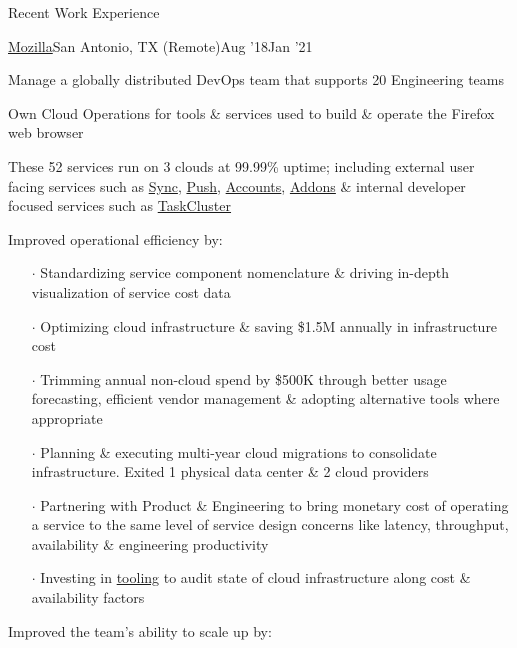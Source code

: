 \documentclass{resume} %
\begin{document}
\begin{rSection}{Recent Work Experience}
\begin{rSubsection}{\href{https://www.mozilla.org/}{Mozilla}}{San Antonio, TX (Remote)}{Aug '18}{Jan '21}
\item Manage a globally distributed DevOps team that supports 20 Engineering teams
\item Own Cloud Operations for tools \& services used to build \& operate the Firefox web browser
\item These 52 services run on 3 clouds at 99.99\% uptime; including external user facing services such as \href{https://github.com/mozilla-services/syncstorage-rs}{Sync}, \href{https://github.com/mozilla-services/autopush-rs}{Push}, \href{https://github.com/mozilla/fxa}{Accounts}, \href{https://github.com/mozilla/addons}{Addons} \& internal developer focused services such as \href{https://github.com/taskcluster}{TaskCluster}
  \item Improved operational efficiency by:
  \vspace{-0.5em}
    \begin{itemize} \itemsep0.5pt \parskip0pt
    \item[$\cdot$] Standardizing service component nomenclature \& driving in-depth visualization of service cost data
    \item[$\cdot$] Optimizing cloud infrastructure \& saving \$1.5M annually in infrastructure cost
    \item[$\cdot$] Trimming annual non-cloud spend by \$500K through better usage forecasting, efficient vendor management \& adopting alternative tools where appropriate
    \item[$\cdot$] Planning \& executing multi-year cloud migrations to consolidate infrastructure. Exited 1 physical data center \& 2 cloud providers
    \item[$\cdot$] Partnering with Product \& Engineering to bring monetary cost of operating a service to the same level of service design concerns like latency, throughput, availability \& engineering productivity
    \item[$\cdot$] Investing in \href{https://github.com/mozilla/frost}{tooling} to audit state of cloud infrastructure along cost \& availability factors
    \end{itemize}
  \item Improved the team's ability to scale up by:
     \vspace{-0.5em}
    \begin{itemize} \itemsep0.5pt \parskip0pt 

\end{itemize}
\end{rSubsection}
\end{rSection}
\end{document}
